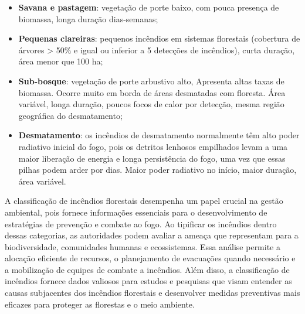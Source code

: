 \begin{itemize}
    \item  \textbf{Savana e pastagem}: vegetação de porte baixo, com pouca presença de biomassa, longa duração dias-semanas;
    \item \textbf{Pequenas clareiras}: pequenos incêndios em sistemas florestais (cobertura de árvores > 50$\%$ e igual ou inferior a 5 detecções de incêndios), curta duração, área menor que 100 ha;
    \item \textbf{Sub-bosque}: vegetação de porte arbustivo alto, Apresenta altas taxas de biomassa. Ocorre muito em borda de áreas desmatadas com floresta. Área variável, longa duração, poucos focos de calor por detecção, mesma região geográfica do desmatamento;
    \item \textbf{Desmatamento}: os incêndios de desmatamento normalmente têm alto poder radiativo inicial do fogo, pois os detritos lenhosos empilhados levam a uma maior liberação de energia e longa persistência do fogo, uma vez que essas pilhas podem arder por dias. Maior poder radiativo no início, maior duração, área variável.

\end{itemize} 


A classificação de incêndios florestais desempenha um papel crucial na gestão ambiental, pois fornece informações essenciais para o desenvolvimento de estratégias de prevenção e combate ao fogo. Ao tipificar os incêndios dentro dessas categorias, as autoridades podem avaliar a ameaça que representam para a biodiversidade, comunidades humanas e ecossistemas. Essa análise permite a alocação eficiente de recursos, o planejamento de evacuações quando necessário e a mobilização de equipes de combate a incêndios. Além disso, a classificação de incêndios fornece dados valiosos para estudos e pesquisas que visam entender as causas subjacentes dos incêndios florestais e desenvolver medidas preventivas mais eficazes para proteger as florestas e o meio ambiente.

